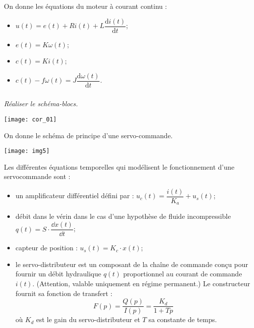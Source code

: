 \setcounter{exo}{0}

On donne les équations du moteur à courant continu :
\begin{itemize}
\item $u(t) = e(t)+ Ri(t) +L \dfrac{\text{d}i(t)}{\text{d} t}$;
\item $e(t)=K\omega(t)$;
\item $c(t)=Ki(t)$;
\item $c(t)- f\omega(t)=J\dfrac{\text{d}\omega(t)}{\text{d} t}$.
\end{itemize}
\subparagraph{}
\textit{Réaliser le schéma-blocs.}

\ifprof
\begin{corrige}
\begin{center}
\texttt{[image: cor\_01]}
\end{center}
\end{corrige}
\else
\fi

\vspace{.5cm}

On donne le schéma de principe d'une servo-commande.
\begin{center}
\texttt{[image: img5]}
\end{center}

Les différentes équations temporelles qui modélisent le fonctionnement d'une servocommande sont :
\begin{itemize}
\item un amplificateur différentiel défini par : $u_c(t)=\dfrac{i(t)}{K_a}+u_s(t)$;
\item débit dans le vérin dans le cas d'une hypothèse de fluide incompressible $q(t)=S\cdot\dfrac{\dd x(t)}{\dd t}$;
\item capteur de position : $u_s(t)=K_c\cdot x(t)$;
\item le servo-distributeur est un composant de la chaîne de commande conçu pour fournir un débit hydraulique $q(t)$ proportionnel au courant de commande $i(t)$. (Attention, valable uniquement en régime permanent.) Le constructeur fournit sa fonction de transfert :
$$
F(p)=\dfrac{Q(p)}{I(p)}=\dfrac{K_d}{1+Tp}
$$
où $K_d$ est le gain du servo-distributeur et $T$ sa constante de temps.
\end{itemize}

